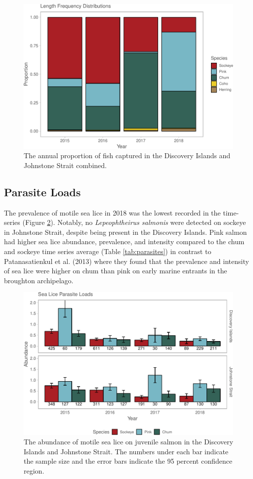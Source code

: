 \documentclass[fleqn,10pt]{wlpeerj} %
\begin{document}
\begin{figure}[H]
\includegraphics[width=0.9\linewidth]{peer_j_migration_dynamics_files/figure-latex/prop-1} \caption{The annual proportion of fish captured in the Discovery Islands and Johnstone Strait combined.}\label{fig:prop}
\end{figure}

\subsection*{Parasite Loads}\label{parasite-loads}

The prevalence of motile sea lice in 2018 was the lowest recorded in the
time-series (Figure \ref{fig:sealice}). Notably, no \emph{Lepeophtheirus
salmonis} were detected on sockeye in Johnstone Strait, despite being
present in the Discovery Islands. Pink salmon had higher sea lice
abundance, prevalence, and intensity compared to the chum and sockeye
time series average (Table \ref{tab:parasites}) in contrast to
Patanasatienkul et al. (2013) where they found that the prevalence and
intensity of sea lice were higher on chum than pink on early marine
entrants in the broughton archipelago.

\begin{figure}[H]
\includegraphics[width=0.9\linewidth]{peer_j_migration_dynamics_files/figure-latex/sealice-1} \caption{The abundance of motile sea lice on juvenile salmon in the Discovery Islands and Johnstone Strait. The numbers under each bar indicate the sample size and the error bars indicate the 95 percent confidence region.}\label{fig:sealice}
\end{figure}
\end{document}
